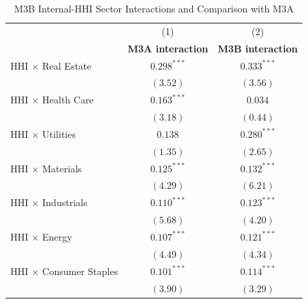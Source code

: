 
\begin{table}[!htbp]
\centering
\small
\caption{M3B Internal-HHI Sector Interactions and Comparison with M3A}
\label{tab:appendix_m3b_hhi_interactions}

\begin{threeparttable}
\begin{tabular}{l c c}
\toprule
 & (1) & (2) \\
 & \textbf{M3A interaction} & \textbf{M3B interaction} \\
\midrule
HHI $\times$ Real Estate            & $0.298^{***}$   & $0.333^{***}$   \\
                                    & $(3.52)$        & $(3.56)$        \\
HHI $\times$ Health Care            & $0.163^{***}$   & $0.034$         \\
                                    & $(3.18)$        & $(0.44)$        \\
HHI $\times$ Utilities              & $0.138$         & $0.280^{***}$   \\
                                    & $(1.35)$        & $(2.65)$        \\
HHI $\times$ Materials              & $0.125^{***}$   & $0.132^{***}$   \\
                                    & $(4.29)$        & $(6.21)$        \\
HHI $\times$ Industrials            & $0.110^{***}$   & $0.123^{***}$   \\
                                    & $(5.68)$        & $(4.20)$        \\
HHI $\times$ Energy                 & $0.107^{***}$   & $0.121^{***}$   \\
                                    & $(4.49)$        & $(4.34)$        \\
HHI $\times$ Consumer Staples       & $0.101^{***}$   & $0.114^{***}$   \\
                                    & $(3.90)$        & $(3.29)$        \\

\end{tabular}
\end{threeparttable}
\end{table}
